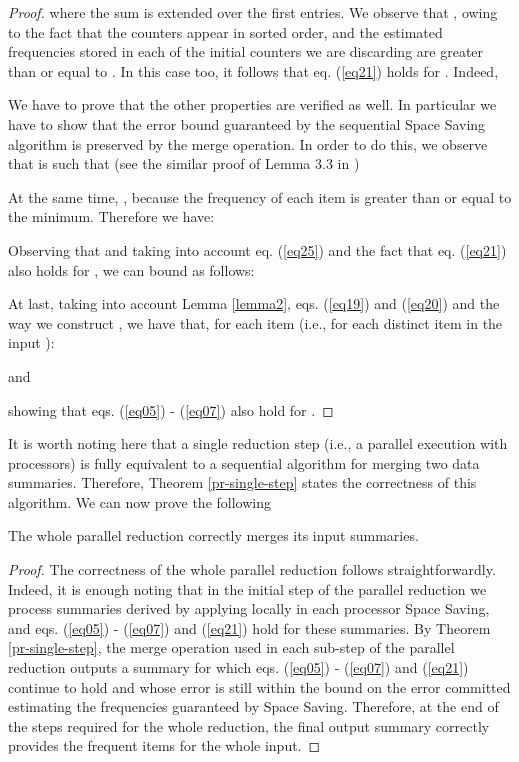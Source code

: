 \documentclass[final,3p,times]{elsarticle}
\newcommand\noi{\noindent}
\begin{document}
\begin{proof}
\noi where the sum is extended over the first  entries. We observe that , owing to the fact that the counters appear in sorted order, and the estimated frequencies stored in each of the initial  counters we are discarding are greater than or equal to . In this case too, it follows that eq. (\ref{eq21}) holds for . Indeed,



We have to prove that the other properties are verified as well. In particular we have to show that the error bound guaranteed by the sequential Space Saving algorithm is preserved by the merge operation. In order to do this, we observe that  is such that (see the similar proof of Lemma 3.3 in \cite{Metwally2006})



At the same time, , because the frequency of each item is greater than or equal to the minimum. Therefore we have:



Observing that  and taking into account eq. (\ref{eq25}) and the fact that eq. (\ref{eq21}) also holds for , we can bound  as follows:



At last, taking into account Lemma \ref{lemma2}, eqs. (\ref{eq19}) and (\ref{eq20}) and the way we construct , we have that, for each item  (i.e., for each distinct item in the input ):



and



\noi showing that eqs. (\ref{eq05}) - (\ref{eq07}) also hold for .

\end{proof}

\noi It is worth noting here that a single reduction step (i.e., a parallel execution with  processors) is fully equivalent to a sequential algorithm for merging two data summaries. Therefore, Theorem \ref{pr-single-step} states the correctness of this algorithm.  We can now prove the following

\begin{prop}
\label{pr-whole}
The whole parallel reduction correctly merges its input summaries.
\end{prop}

\begin{proof}

The correctness of the whole parallel reduction follows straightforwardly. Indeed, it is enough noting that in the initial step of the parallel reduction we process summaries derived by applying locally in each processor Space Saving, and eqs. (\ref{eq05}) - (\ref{eq07}) and (\ref{eq21}) hold for these summaries. By Theorem \ref{pr-single-step}, the merge operation used in each sub-step of the parallel reduction outputs a summary for which eqs. (\ref{eq05}) - (\ref{eq07}) and (\ref{eq21}) continue to hold and whose error is still within the bound on the error committed estimating the frequencies guaranteed by Space Saving. Therefore, at the end of the  steps required for the whole reduction, the final output summary correctly provides the frequent items for the whole input.

\end{proof}
\end{document}
